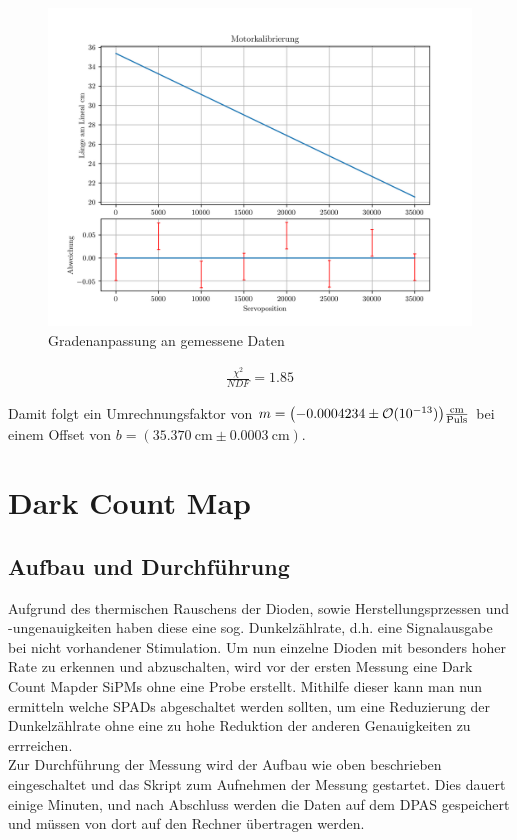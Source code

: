 \documentclass[12pt,twoside,a4paper]{scrartcl}
\begin{document}
			\begin{figure}[H]
				\centering
					\includegraphics[width=\textwidth]{Plots/WegKalib.png}
				\caption{Gradenanpassung an gemessene Daten}
			\end{figure}

			\begin{align*}
				\frac{\chi^2}{NDF} = 1.85
			\end{align*}

			Damit folgt ein Umrechnungsfaktor von $m = \qty(-0.0004234 \pm \mathcal{O}(10^{-13})) \frac{\si{\centi \metre}}{\text{Puls}}$ bei einem Offset von $b = (\SI{35.370}{\centi \metre} \pm \SI{0.0003}{\centi \metre})$.


	\section{Dark Count Map}
	\label{DCM}

		\subsection{Aufbau und Durchführung}

			Aufgrund des thermischen Rauschens der Dioden, sowie Herstellungsprzessen und -ungenauigkeiten haben diese eine sog. \glqq Dunkelzählrate\grqq, d.h. eine Signalausgabe bei nicht vorhandener Stimulation. Um nun einzelne Dioden mit besonders hoher Rate zu erkennen und abzuschalten, wird vor der ersten Messung eine \glqq Dark Count Map\grqq der SiPMs ohne eine Probe erstellt. Mithilfe dieser kann man nun ermitteln welche SPADs abgeschaltet werden sollten, um eine Reduzierung der Dunkelzählrate ohne eine zu hohe Reduktion der anderen Genauigkeiten zu errreichen.\\
			Zur Durchführung der Messung wird der Aufbau wie oben beschrieben eingeschaltet und das Skript zum Aufnehmen der Messung gestartet. Dies dauert einige Minuten, und nach Abschluss werden die Daten auf dem DPAS gespeichert und müssen von dort auf den Rechner übertragen werden.
\end{document}
